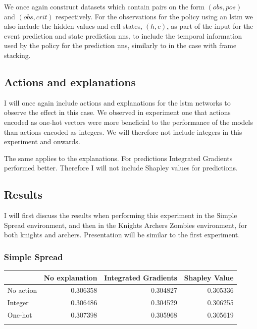\documentclass[UKenglish]{uiomasterthesis}
\begin{document}
We once again construct datasets which contain pairs on the form $(obs, pos)$ and $(obs, crit)$ respectively. For the observations for the policy using an \ac{lstm} we also include the hidden values and cell states, $(h,c)$, as part of the input for the event prediction and state prediction \acp{nn}, to include the temporal information used by the policy for the prediction \acp{nn}, similarly to in the case with frame stacking.

\subsection{Actions and explanations}
I will once again include actions and explanations for the \ac{lstm} networks to observe the effect in this case. We observed in experiment one that actions encoded as one-hot vectors were more beneficial to the performance of the models than actions encoded as integers. We will therefore not include integers in this experiment and onwards.

The same applies to the explanations. For predictions Integrated Gradients performed better. Therefore I will not include Shapley values for predictions.

\subsection{Results}
I will first discuss the results when performing this experiment in the Simple Spread environment, and then in the Knights Archers Zombies environment, for both knights and archers. Presentation will be similar to the first experiment.

\subsubsection{Simple Spread}

\begin{center}
\label{tab:state_simpl_lstm}
\begin{tabular}{lrrr}
\toprule
 & No explanation & Integrated Gradients & Shapley Value \\
\midrule
No action & 0.306358 & 0.304827 & 0.305336 \\
Integer & 0.306486 & 0.304529 & 0.306255 \\
One-hot & 0.307398 & 0.305968 & 0.305619 \\
\bottomrule
\addlinespace[2pt]
\end{tabular}
\end{center}
\end{document}
